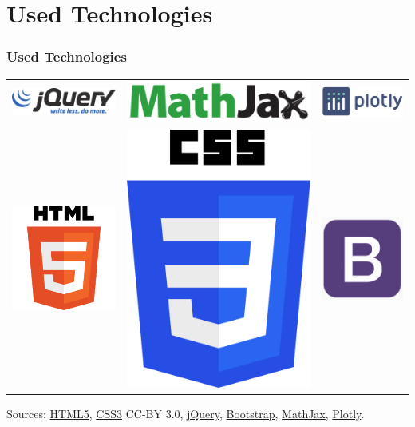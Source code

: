 \documentclass[english,hangout]{beamer}
\begin{document}
\section{Used Technologies}
\begin{frame}
	\frametitle{Used Technologies}
  \begin{tabular*}{0.84\linewidth}{ccc}
      \includegraphics[width=0.28\linewidth]{jQuery} &
      \includegraphics[width=0.28\linewidth]{MathJax} &
      \includegraphics[width=0.28\linewidth]{plotly} \\
    \includegraphics[height=0.25\linewidth]{HTML5} &
    \includegraphics[height=0.25\linewidth]{CSS3} &
      \includegraphics[height=0.22\linewidth]{bootstrap} \\
  \end{tabular*}
  \begin{center}
    \footnotesize
    Sources:
    \href{https://www.w3.org/html/logo/}{HTML5},
    \href{https://commons.wikimedia.org/wiki/File:CSS3_logo_and_wordmark.svg}{CSS3} CC-BY 3.0,
    \href{https://brand.jquery.org/logos/}{jQuery},
    \href{https://getbootstrap.com/docs/4.5/about/brand/}{Bootstrap},
    \href{https://www.mathjax.org/}{MathJax},
    \href{https://plotly.com/}{Plotly}.
  \end{center}
\end{frame}
\end{document}
